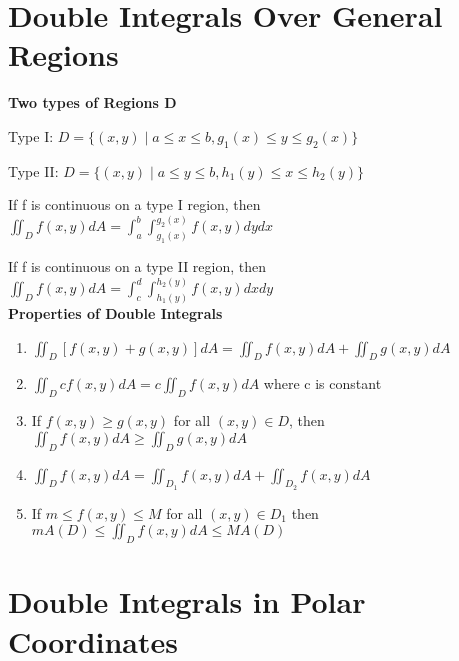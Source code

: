 \documentclass{article}
\begin{document}
\section{Double Integrals Over General Regions}

\textbf{Two types of Regions D}

Type I: $D = \{(x, y) \mid a \leq x \leq b, g_1(x) \leq y \leq g_2(x) \}$

Type II: $D = \{(x, y) \mid a \leq y \leq b, h_1(y) \leq x \leq h_2(y)\}$

If f is continuous on a type I region, then 
$\iint_D f(x, y)dA = \int_a^b \int_{g_1(x)}^{g_2(x)} f(x, y) dydx$


If f is continuous on a type II region, then 
$\iint_D f(x, y) dA = \int_c^d \int_{h_1(y)}^{h_2(y)} f(x, y) dxdy$\\


\textbf{Properties of Double Integrals}
\begin{enumerate}
\item $\iint_D [f(x, y) + g(x, y)] dA = \iint_D f(x, y) dA + \iint_D g(x, y)dA$
\item $\iint_D cf(x, y) dA = c\iint_D f(x,y) dA$  where c is constant
\item If $f(x, y) \geq g(x, y)$ for all $(x, y) \in D$, then $\iint_D f(x, y) dA \geq \iint_D g(x, y) dA$
\item  $\iint_D f(x, y) dA = \iint_{D_1} f(x, y) dA + \iint_{D_2} f(x, y) dA$
\item If $m \leq f(x, y) \leq M$ for all $(x,y) \in D_1$ then $m A(D) \leq \iint_D f(x, y) dA \leq M A(D)$
\end{enumerate}

\section{Double Integrals in Polar Coordinates}





\end{document}
